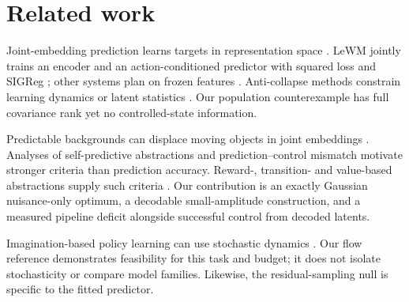 \section{Related work}
\label{sec:related}

Joint-embedding prediction learns targets in representation space
\citep{lecun2022path,assran2023ijepa,bardes2024vjepa}. LeWM jointly trains an encoder and an
action-conditioned predictor with squared loss and SIGReg
\citep{maes2026lewm,balestriero2025lejepa}; other systems plan on frozen features
\citep{assran2025vjepa2,zhou2024dinowm,sobal2025pldm}.
Anti-collapse methods constrain learning dynamics or latent statistics
\citep{grill2020byol,chen2021simsiam,zbontar2021barlow,bardes2022vicreg,jing2022dimensional}.
Our population counterexample has full covariance rank yet no controlled-state information.

Predictable backgrounds can displace moving objects in joint embeddings \citep{sobal2022slow}.
Analyses of self-predictive abstractions \citep{tang2023selfpredictive,ni2024bridging} and
prediction--control mismatch \citep{lambert2020objective} motivate stronger criteria than prediction
accuracy. Reward-, transition- and value-based abstractions supply such criteria
\citep{ferns2004bisimulation,zhang2021dbc,grimm2020value,farahmand2017vaml}.
Our contribution is an exactly Gaussian nuisance-only optimum, a decodable small-amplitude
construction, and a measured pipeline deficit alongside successful control from decoded latents.

Imagination-based policy learning \citep{sutton1991dyna,ha2018worldmodels,hafner2020dreamer}
can use stochastic dynamics \citep{hafner2019planet,hafner2023dreamerv3,alonso2024diamond,hafner2025dreamer4}.
Our flow reference demonstrates feasibility for this task and budget; it does not isolate stochasticity
or compare model families. Likewise, the residual-sampling null is specific to the fitted predictor.
